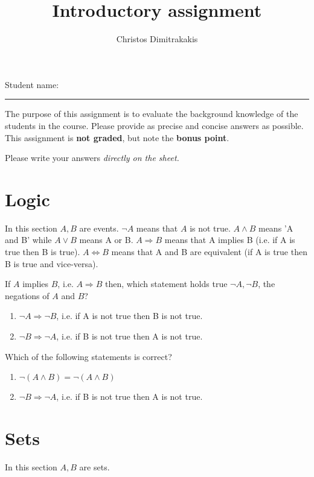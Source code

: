 \documentclass[a4paper]{article}
\title{Introductory assignment}
\author{Christos Dimitrakakis}
\begin{document}
\maketitle

{\Large Student name:}
\vspace{0.5em}
\hrule
\vspace{1em}
The purpose of this assignment is to evaluate the background knowledge
of the students in the course. Please provide as precise and concise
answers as possible. This assignment is \textbf{not graded}, but note the \textbf{bonus point}.

Please write your answers \emph{directly on the sheet.}

\section{Logic}
In this section $A, B$ are events. $\neg A$ means that $A$ is not true. $A \wedge B$ means 'A and B' while $A
\vee B$ means A or B. $A \Rightarrow B$ means that A implies B (i.e. if A is true then B is true).
$A \Leftrightarrow B$ means that A and B are equivalent (if A is true then B is true and vice-versa).

\begin{exercise}
  If $A$ implies $B$, i.e. $A \Rightarrow B$ then, which statement holds true $\neg A, \neg B$, the negations of $A$ and $B$?
  \begin{enumerate}
  \item $\neg A \Rightarrow \neg B$, i.e. if A is not true then B is not true.
  \item $\neg B \Rightarrow \neg A$, i.e. if B is not true then A is not true.
  \end{enumerate}
\end{exercise}

\begin{exercise}
  Which of the following statements is correct?
  \begin{enumerate}
  \item $\neg (A \wedge B) = \neg (A \wedge B)$
  \item $\neg B \Rightarrow \neg A$, i.e. if B is not true then A is not true.
  \end{enumerate}
\end{exercise}


\section{Sets}
In this section $A, B$ are sets.
\end{document}

